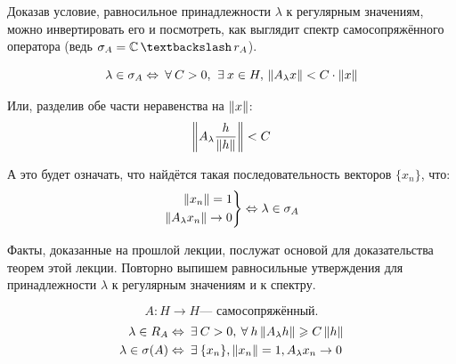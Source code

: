 \documentclass[12pt]{article}
\begin{document}
	Доказав условие, равносильное принадлежности $\lambda$ к регулярным значениям, можно инвертировать его и посмотреть,
	как выглядит спектр самосопряжённого оператора%
	(ведь $\sigma_A = \mathbb{C} \,\textbackslash\, r_A$).
	
	$$\lambda \in \sigma_A \Leftrightarrow \forall C > 0,\, \exists x \in H,\, \norm{A_{\lambda}x} < C\cdot\norm{x}$$
	
	Или, разделив обе части неравенства на $\left\| x \right\|$:
	$$\left\| A_{\lambda} \dfrac{h}{\left\| h \right\|} \right\| < C$$
	
	А это будет означать, что найдётся такая последовательность векторов $\{x_n\}$, что:
	$$
		\left.
		\begin{aligned}
			\left\| x_n \right\| = 1 \\
			\left\| A_{\lambda}x_n \right\| \rightarrow 0
		\end{aligned}
		\right\}
		\Leftrightarrow
		\lambda \in \sigma_A
	$$


	Факты, доказанные на прошлой лекции, послужат основой для доказательства теорем этой лекции.
	Повторно выпишем равносильные утверждения для принадлежности $\lambda$ к регулярным значениям и к спектру.
	
	$$A:H \rightarrow H \text{--- самосопряжённый.}$$
	\begin{align}
		\lambda \in R_A       &\equals \exists C > 0, \forall h \norm{A_{\lambda}h} \geq C\norm{h} \label{eq:regCrit}\\
		\lambda \in \sigma(A) &\equals \exists\{x_n\}, \norm{x_n} = 1, A_{\lambda}x_n \rightarrow 0 \label{eq:specCrit}
	\end{align}
	
\end{document}
